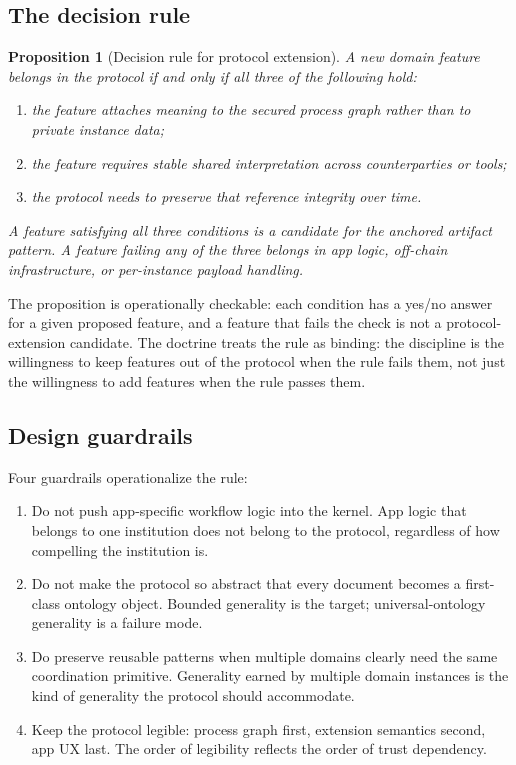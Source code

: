 \documentclass[11pt,a4paper]{article}
\newtheorem{proposition}[theorem]{Proposition}
\theoremstyle{definition}
\theoremstyle{remark}
\begin{document}
\subsection{The decision rule}

\begin{proposition}[Decision rule for protocol extension]
\label{prop:decision-rule}
A new domain feature belongs in the protocol if and only if all
three of the following hold:
\begin{enumerate}[label=(\arabic*)]
  \item the feature attaches meaning to the secured process graph
    rather than to private instance data;
  \item the feature requires stable shared interpretation across
    counterparties or tools;
  \item the protocol needs to preserve that reference integrity over
    time.
\end{enumerate}
A feature satisfying all three conditions is a candidate for the
anchored artifact pattern. A feature failing any of the three
belongs in app logic, off-chain infrastructure, or per-instance
payload handling.
\end{proposition}

The proposition is operationally checkable: each condition has a
yes/no answer for a given proposed feature, and a feature that fails
the check is not a protocol-extension candidate. The doctrine
treats the rule as binding: the discipline is the willingness to
keep features out of the protocol when the rule fails them, not just
the willingness to add features when the rule passes them.

\subsection{Design guardrails}

Four guardrails operationalize the rule:

\begin{enumerate}
  \item Do not push app-specific workflow logic into the kernel.
    App logic that belongs to one institution does not belong to the
    protocol, regardless of how compelling the institution is.
  \item Do not make the protocol so abstract that every document
    becomes a first-class ontology object. Bounded generality is the
    target; universal-ontology generality is a failure mode.
  \item Do preserve reusable patterns when multiple domains clearly
    need the same coordination primitive. Generality earned by
    multiple domain instances is the kind of generality the protocol
    should accommodate.
  \item Keep the protocol legible: process graph first, extension
    semantics second, app UX last. The order of legibility reflects
    the order of trust dependency.
\end{enumerate}
\end{document}

